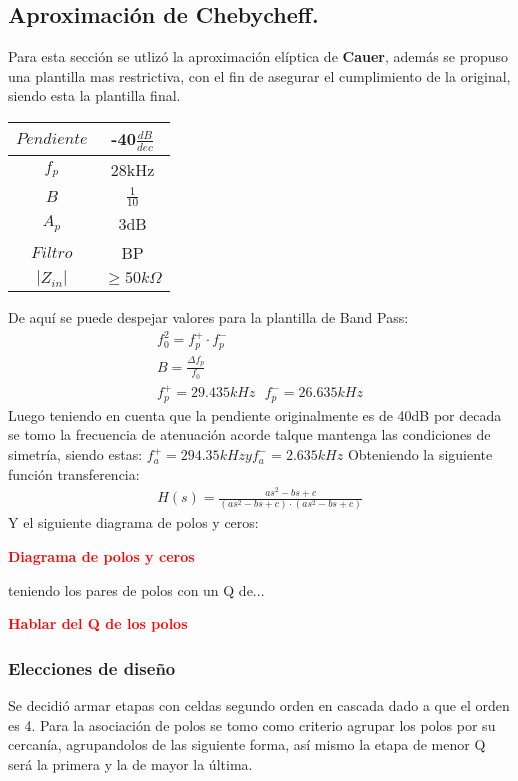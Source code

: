 \subsection{Aproximación de Chebycheff.}
Para esta sección se utlizó la aproximación elíptica de \textbf{Cauer}, además se propuso una plantilla mas restrictiva, con el fin de asegurar el cumplimiento de la original, siendo esta la plantilla final.
\begin{table}[H]
\centering
\begin{tabular}{|c|c|}
\hline
$Pendiente$      & -40$\frac{dB}{dec}$           \\ \hline
$f_p$      & 28kHz          \\ \hline
$B$      & $\frac{1}{10}$           \\ \hline
$A_p$      & 3dB               \\ \hline
$Filtro$      & BP              \\ \hline
$|Z_{in}|$ & $\geq 50k \Omega$ \\ \hline
\end{tabular}
\end{table}
De aquí se puede despejar valores para la plantilla de Band Pass:
\begin{align}
f_0^2 = f_p^+ \cdot f_p^- \\
B = \frac{\Delta f_p}{f_0}\\
f_p^+ =29.435 kHz  \ \ \ f_p^- = 26.635 kHz
\end{align}
Luego teniendo en cuenta que la pendiente originalmente es de 40dB por decada se tomo la frecuencia de atenuación acorde  talque mantenga las condiciones de simetría, siendo estas: $f_a^+= 294.35kHz y f_a^- = 2.635kHz$
Obteniendo la siguiente función transferencia:
\begin{align}
	H(s)=\frac{as^2-bs+c}{(as^2-bs+c)\cdot (as^2-bs+c)}
\end{align}
Y el siguiente diagrama de polos y ceros:
\begin{center}
	\huge{\textcolor{red}{\textbf{Diagrama de polos y ceros}}}
\end{center}
teniendo los pares de polos con un Q de...
\begin{center}
	\huge{\textcolor{red}{\textbf{Hablar del Q de los polos}}}
\end{center}
\subsubsection{Elecciones de diseño}
Se decidió armar etapas con celdas segundo orden en cascada dado a que el orden es 4.
Para la asociación de polos se tomo como criterio agrupar los polos por su cercanía, agrupandolos de las siguiente forma, así mismo la etapa de menor Q será la primera y la de mayor la última.
